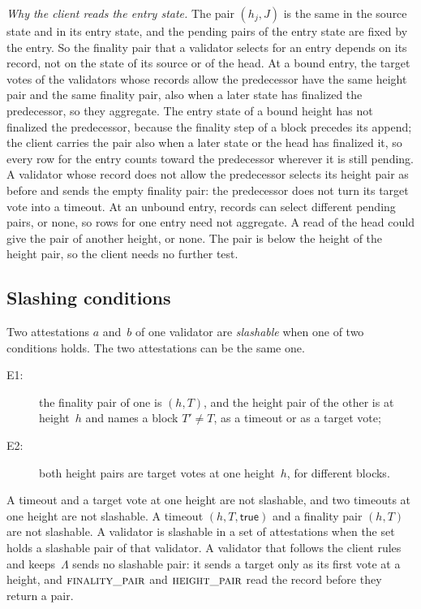 \emph{Why the client reads the entry state.}  The pair $(h_j,J)$ is
the same in the source state and in its entry state, and the pending
pairs of the entry state are fixed by the entry.  So the finality pair
that a validator selects for an entry depends on its record, not on the
state of its source or of the head.  At a bound entry, the target votes
of the validators whose records allow the predecessor have the same
height pair and the same finality pair, also when a later state has
finalized the predecessor, so they aggregate.  The entry state of a bound
height has not finalized the predecessor, because the finality step of a
block precedes its append; the client carries the pair also when a later
state or the head has finalized it, so every row for the entry counts
toward the predecessor wherever it is still pending.  A validator whose
record does not allow the predecessor selects its height pair as before
and sends the empty finality pair: the predecessor does not turn its
target vote into a timeout.  At an unbound entry, records can select
different pending pairs, or none, so rows for one entry need not
aggregate.  A read of the head could give the pair of another height, or
none.  The pair is below the height of the height pair, so the client
needs no further test.

\subsection{Slashing conditions}\label{sec:fg-slashing}

Two attestations $a$ and~$b$ of one validator are \emph{slashable} when
one of two conditions holds.  The two attestations can be the same one.
\begin{description}
 \item[E1:] the finality pair of one is $(h,T)$, and the height pair of
   the other is at height~$h$ and names a block $T'\neq T$, as a timeout
   or as a target vote;
 \item[E2:] both height pairs are target votes at one height~$h$, for
   different blocks.
\end{description}
A timeout and a target vote at one height are not slashable, and two
timeouts at one height are not slashable.  A timeout $(h,T,\mathsf{true})$
and a finality pair $(h,T)$ are not slashable.  A validator is slashable in a
set of attestations when the set holds a slashable pair of that validator.
A validator that follows the client rules and keeps~$\Lambda$ sends no
slashable pair: it sends a target only as its first vote at a height, and
$\Call{finality\_pair}{}$ and $\Call{height\_pair}{}$ read the record
before they return a pair.

